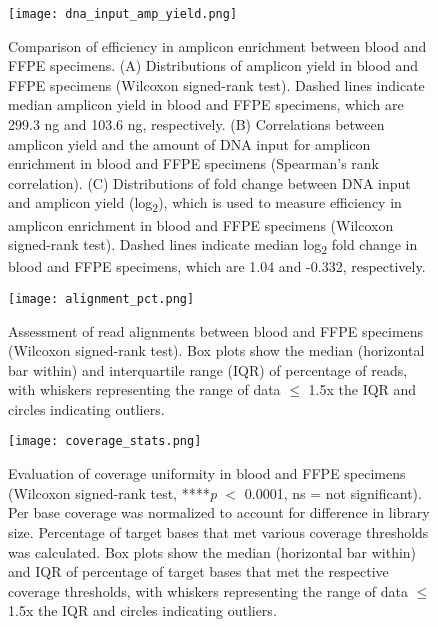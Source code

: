 \begin{figure}[H]
	\centering
	\texttt{[image: dna\_input\_amp\_yield.png]}
	\caption[Comparison of efficiency in amplicon enrichment between blood and FFPE specimens.]{Comparison of efficiency in amplicon enrichment between blood and FFPE specimens. (A) Distributions of amplicon yield in blood and FFPE specimens (Wilcoxon signed-rank test). Dashed lines indicate median amplicon yield in blood and FFPE specimens, which are 299.3 ng and 103.6 ng, respectively. (B) Correlations between amplicon yield and the amount of DNA input for amplicon enrichment in blood and FFPE specimens (Spearman's rank correlation). (C) Distributions of fold change between DNA input and amplicon yield (log\textsubscript{2}), which is used to measure efficiency in amplicon enrichment in blood and FFPE specimens (Wilcoxon signed-rank test). Dashed lines indicate median log\textsubscript{2} fold change in blood and FFPE specimens, which are 1.04 and -0.332, respectively.}
	\label{fig:dna_input_amp_yield}
\end{figure}


\begin{figure}[H]
	\centering
	\texttt{[image: alignment\_pct.png]}
	\caption[Assessment of read alignments between blood and FFPE specimens (Wilcoxon signed-rank test).]{Assessment of read alignments between blood and FFPE specimens (Wilcoxon signed-rank test). Box plots show the median (horizontal bar within) and interquartile range (IQR) of percentage of reads, with whiskers representing the range of data $\leq$ 1.5x the IQR and circles indicating outliers.}
	\label{fig:alignment_pct}
\end{figure}


\begin{figure}[H]
	\centering
	\texttt{[image: coverage\_stats.png]}
	\caption[Evaluation of coverage uniformity in blood and FFPE specimens (Wilcoxon signed-rank test, ****\textit{p} $<$ 0.0001, ns = not significant).]{Evaluation of coverage uniformity in blood and FFPE specimens (Wilcoxon signed-rank test, ****\textit{p} $<$ 0.0001, ns = not significant). Per base coverage was normalized to account for difference in library size. Percentage of target bases that met various coverage thresholds was calculated. Box plots show the median (horizontal bar within) and IQR of percentage of target bases that met the respective coverage thresholds, with whiskers representing the range of data $\leq$ 1.5x the IQR and circles indicating outliers.}
	\label{fig:coverage_stats}
\end{figure}

